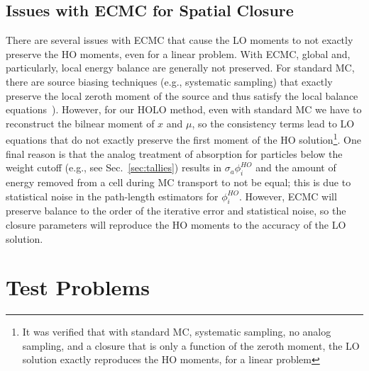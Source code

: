\subsection{Issues with ECMC for Spatial Closure}
\label{sec:ecmc_issues}
There are several issues with ECMC that cause the LO moments to not exactly preserve
the HO moments, even for a linear problem.  With ECMC, global and, particularly, local
energy balance are generally not preserved.  For standard MC, there
are source biasing techniques (e.g., systematic
sampling) that exactly preserve the local zeroth moment of the
source and thus satisfy the local balance equations~\cite{shultis_mc,wollaber_review}). 
However, for our HOLO method, even with standard MC we have to reconstruct the bilnear moment
of $x$ and $\mu$, so the consistency terms lead to LO equations that do not exactly
preserve the first moment of the HO solution\footnote{It was verified that with
standard MC, systematic sampling, no analog sampling, and a closure that is only a
function of the zeroth moment, the LO solution exactly reproduces the HO moments, for
a linear problem}.  One final reason is that the analog treatment of absorption for
particles below the weight cutoff (e.g., see Sec.~\ref{sec:tallies}) results in
$\sigma_a \phi^{HO}_i$ and the amount of energy removed from a cell during MC
transport to not be equal; this is due to statistical noise in the path-length
estimators for $\phi^{HO}_i$.  However, ECMC will preserve balance to the order of
the iterative error and statistical noise, so the closure parameters will reproduce
the HO moments to the accuracy of the LO solution.  

\section{Test Problems}

